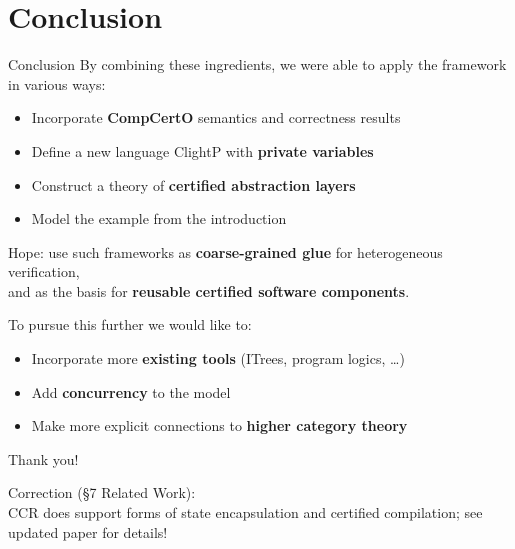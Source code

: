 \documentclass[aspectratio=1610,mathserif]{beamer}
\begin{document}
\section{Conclusion}

\begin{frame}{Conclusion} %
  By combining these ingredients,
  we were able to apply the framework in various ways:
  \begin{itemize}
    \item Incorporate \textbf{CompCertO} semantics and correctness results
    \item Define a new language ClightP with \textbf{private variables}
    \item Construct a theory of \textbf{certified abstraction layers}
    \item Model the example from the introduction
  \end{itemize}

  \pause
  Hope:
  use such frameworks as
    \textbf{coarse-grained glue} for heterogeneous verification, \\
    and as the basis for
    \textbf{reusable certified software components}.

  \pause
  To pursue this further we would like to:
  \begin{itemize}
    \item Incorporate more \textbf{existing tools} (ITrees, program logics, \ldots)
    \item Add \textbf{concurrency} to the model
    \item Make more explicit connections to \textbf{higher category theory}
  \end{itemize}
\end{frame}

\begin{frame} %
  \vspace{8em}
  \begin{center}
    \Large
    Thank you!
  \end{center}
  \vspace{8em}
  \footnotesize
  Correction (\S{}7 Related Work): \\
    CCR does support forms of state encapsulation and certified compilation;
    see updated paper for details!
\end{frame}

\appendix
\end{document}
